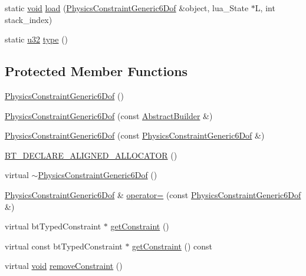\begin{DoxyCompactItemize}
\item 
static \mbox{\hyperlink{_thread_8h_af1e856da2e658414cb2456cb6f7ebc66}{void}} \mbox{\hyperlink{classnjli_1_1_physics_constraint_generic6_dof_a4a498b612c781bef2aef8f7b7986331a}{load}} (\mbox{\hyperlink{classnjli_1_1_physics_constraint_generic6_dof}{Physics\+Constraint\+Generic6\+Dof}} \&object, lua\+\_\+\+State $\ast$L, int stack\+\_\+index)
\item 
static \mbox{\hyperlink{_util_8h_a10e94b422ef0c20dcdec20d31a1f5049}{u32}} \mbox{\hyperlink{classnjli_1_1_physics_constraint_generic6_dof_addf3c9314c7f54a6e816f961b89f3c5c}{type}} ()
\end{DoxyCompactItemize}
\subsection*{Protected Member Functions}
\begin{DoxyCompactItemize}
\item 
\mbox{\hyperlink{classnjli_1_1_physics_constraint_generic6_dof_a5c2718defc17ccb5f247cd5151cd8a82}{Physics\+Constraint\+Generic6\+Dof}} ()
\item 
\mbox{\hyperlink{classnjli_1_1_physics_constraint_generic6_dof_a9cc10b347756198caf3d519bc4a73acd}{Physics\+Constraint\+Generic6\+Dof}} (const \mbox{\hyperlink{classnjli_1_1_abstract_builder}{Abstract\+Builder}} \&)
\item 
\mbox{\hyperlink{classnjli_1_1_physics_constraint_generic6_dof_a7b9691c73edd82ba0d12d2e8d5c0a02f}{Physics\+Constraint\+Generic6\+Dof}} (const \mbox{\hyperlink{classnjli_1_1_physics_constraint_generic6_dof}{Physics\+Constraint\+Generic6\+Dof}} \&)
\item 
\mbox{\hyperlink{classnjli_1_1_physics_constraint_generic6_dof_ae50cbc7db6e709453f0cefc167a12ced}{B\+T\+\_\+\+D\+E\+C\+L\+A\+R\+E\+\_\+\+A\+L\+I\+G\+N\+E\+D\+\_\+\+A\+L\+L\+O\+C\+A\+T\+OR}} ()
\item 
virtual \mbox{\hyperlink{classnjli_1_1_physics_constraint_generic6_dof_aa2ab894c3fcbbe373a9d1dc1cc82ce8f}{$\sim$\+Physics\+Constraint\+Generic6\+Dof}} ()
\item 
\mbox{\hyperlink{classnjli_1_1_physics_constraint_generic6_dof}{Physics\+Constraint\+Generic6\+Dof}} \& \mbox{\hyperlink{classnjli_1_1_physics_constraint_generic6_dof_ac42ed9d463f637ef98b2b45112d967aa}{operator=}} (const \mbox{\hyperlink{classnjli_1_1_physics_constraint_generic6_dof}{Physics\+Constraint\+Generic6\+Dof}} \&)
\item 
virtual bt\+Typed\+Constraint $\ast$ \mbox{\hyperlink{classnjli_1_1_physics_constraint_generic6_dof_a0591b18e41f1e1e349ba3cef3e8cf4a4}{get\+Constraint}} ()
\item 
virtual const bt\+Typed\+Constraint $\ast$ \mbox{\hyperlink{classnjli_1_1_physics_constraint_generic6_dof_a55d44efd5fb9dcd1f983f3bb5f2ac6d5}{get\+Constraint}} () const
\item 
virtual \mbox{\hyperlink{_thread_8h_af1e856da2e658414cb2456cb6f7ebc66}{void}} \mbox{\hyperlink{classnjli_1_1_physics_constraint_generic6_dof_ac57766961297ad087fb0ee7dc26e17d8}{remove\+Constraint}} ()
\end{DoxyCompactItemize}

